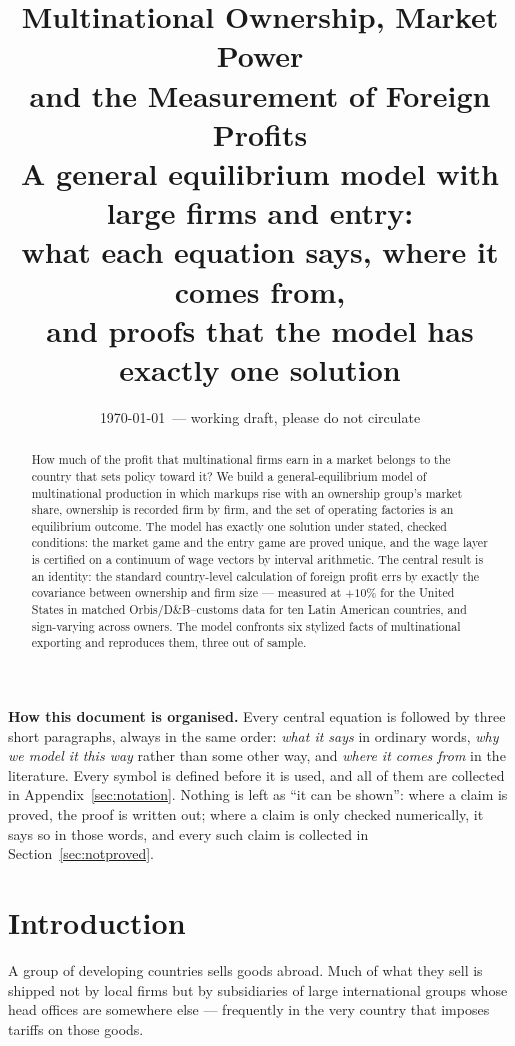 \documentclass[11pt]{article}
\title{\bfseries Multinational Ownership, Market Power\\ and the Measurement of Foreign Profits\\[8pt]
\large A general equilibrium model with large firms and entry:\\
what each equation says, where it comes from,\\
and proofs that the model has exactly one solution}
\date{\today\ --- working draft, please do not circulate}
\newenvironment{keypoint}
  {\begin{lrbox}{\kbox}\begin{minipage}{0.93\textwidth}\vspace{3pt}}
  {\vspace{3pt}\end{minipage}\end{lrbox}\begin{center}\fbox{\usebox{\kbox}}\end{center}}
\theoremstyle{plain}
\theoremstyle{remark}
\theoremstyle{definition}
\begin{document}
\maketitle

\begin{abstract}
\noindent How much of the profit that multinational firms earn in a market belongs
to the country that sets policy toward it? We build a general-equilibrium model of
multinational production in which markups rise with an ownership group's market
share, ownership is recorded firm by firm, and the set of operating factories is an
equilibrium outcome. The model has exactly one solution under stated, checked
conditions: the market game and the entry game are proved unique, and the wage layer
is certified on a continuum of wage vectors by interval arithmetic. The central
result is an identity: the standard country-level calculation of foreign profit errs
by exactly the covariance between ownership and firm size --- measured at $+10\%$
for the United States in matched Orbis/D\&B--customs data for ten Latin American
countries, and sign-varying across owners. The model confronts six stylized facts of
multinational exporting and reproduces them, three out of sample.
\end{abstract}

\begin{keypoint}
\textbf{How this document is organised.} Every central equation is followed by three
short paragraphs, always in the same order: \emph{what it says} in ordinary words,
\emph{why we model it this way} rather than some other way, and \emph{where it comes
from} in the literature. Every symbol is defined before it is used, and all of them
are collected in Appendix~\ref{sec:notation}. Nothing is left as ``it can be
shown'': where a claim is proved, the proof is written out; where a claim is only
checked numerically, it says so in those words, and every such claim is collected in
Section~\ref{sec:notproved}.
\end{keypoint}

\tableofcontents

\newpage
\section{Introduction}
\label{sec:intro}


A group of developing countries sells goods abroad. Much of what they sell is shipped
not by local firms but by subsidiaries of large international groups whose head
offices are somewhere else --- frequently in the very country that imposes tariffs on
those goods.
\end{document}
